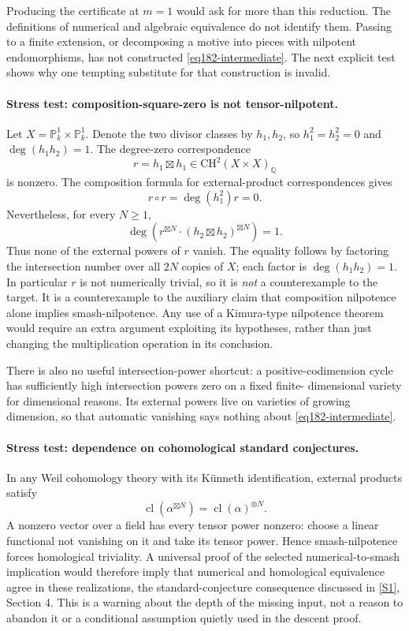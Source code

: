\documentclass[11pt,a4paper]{article}
\newcommand{\Q}{\mathbb{Q}}
\newcommand{\PP}{\mathbb P}
\newcommand{\sref}[2]{\hyperlink{source:#1:#2}{[S#2]}}
\numberwithin{equation}{section}
\begin{document}
Producing the certificate at $m=1$ would ask for more than this reduction.
The definitions of numerical and algebraic equivalence do not identify
them. Passing to a finite extension, or decomposing a motive into pieces
with nilpotent endomorphisms, has not constructed
\eqref{eq182-intermediate}. The next explicit test shows why one tempting
substitute for that construction is invalid.

\paragraph{Stress test: composition-square-zero is not tensor-nilpotent.}
Let $X=\PP^1_k\times\PP^1_k$. Denote the two divisor classes by $h_1,h_2$,
so $h_1^2=h_2^2=0$ and $\deg(h_1h_2)=1$. The degree-zero correspondence
\[
                 r=h_1\boxtimes h_1
                         \in\mathrm{CH}^2(X\times X)_{\Q}
\]
is nonzero. The composition formula for external-product correspondences
gives
\[
                    r\circ r=\deg(h_1^2)r=0.
\]
Nevertheless, for every $N\ge1$,
\begin{equation}\label{eq182-notensor}
 \deg\left(r^{\boxtimes N}\cdot
                      (h_2\boxtimes h_2)^{\boxtimes N}\right)=1.
\end{equation}
Thus none of the external powers of $r$ vanish. The equality follows by
factoring the intersection number over all $2N$ copies of $X$; each factor
is $\deg(h_1h_2)=1$. In particular $r$ is not numerically trivial, so it is
\emph{not} a counterexample to the target. It is a counterexample to the
auxiliary claim that composition nilpotence alone implies smash-nilpotence.
Any use of a Kimura-type nilpotence theorem would require an extra argument
exploiting its hypotheses, rather than just changing the multiplication
operation in its conclusion.

There is also no useful intersection-power shortcut: a positive-codimension
cycle has sufficiently high intersection powers zero on a fixed finite-
dimensional variety for dimensional reasons. Its external powers live on
varieties of growing dimension, so that automatic vanishing says nothing
about \eqref{eq182-intermediate}.

\paragraph{Stress test: dependence on cohomological standard conjectures.}
In any Weil cohomology theory with its K\"unneth identification, external
products satisfy
\[
 \operatorname{cl}(\alpha^{\boxtimes N})
                      =\operatorname{cl}(\alpha)^{\otimes N}.
\]
A nonzero vector over a field has every tensor power nonzero: choose a
linear functional not vanishing on it and take its tensor power. Hence
smash-nilpotence forces homological triviality. A universal proof of the
selected numerical-to-smash implication would therefore imply that
numerical and homological equivalence agree in these realizations, the
standard-conjecture consequence discussed in \sref{statement}{1}, Section 4.
This is a warning about the depth of the missing input, not a reason to
abandon it or a conditional assumption quietly used in the descent proof.
\end{document}
